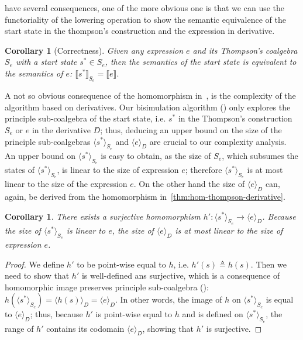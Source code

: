 \documentclass[conference]{IEEEtran}
\newtheorem{corollary}[theorem]{Corollary}
\begin{document}
 have several consequences, one of the more obvious one is that we can use the functoriality of the lowering operation to show the semantic equivalence of the start state in the thompson's construction and the expression in derivative. 

\begin{corollary}[Correctness]
    Given any expression \(e\) and its Thompson's coalgebra \(Ŝ_{e}\) with a start state \(s^* ∈ Ŝ_{e}\), then the semantics of the start state is equivalent to the semantics of \(e\): \(⟦s^*⟧_{Ŝ_{e}} = ⟦e⟧.\)
\end{corollary}

A not so obvious consequence of the homomorphism in~, is the complexity of the algorithm based on derivatives.
Our bisimulation algorithm () only explores the principle sub-coalgebra of the start state, i.e. \(s^*\) in the Thompson's construction \(Ŝ_{e}\) or \(e\) in the derivative \(D̂\); thus, deducing an upper bound on the size of the principle sub-coalgebras \(⟨s^*⟩_{Ŝ_{e}}\) and \(⟨e⟩_{D̂}\) are crucial to our complexity analysis.
An upper bound on \(⟨s^*⟩_{Ŝ_{e}}\) is easy to obtain, as the size of \(Ŝ_{e}\), which subsumes the states of \(⟨s^*⟩_{Ŝ_{e}}\), is linear to the size of expression \(e\); therefore \(⟨s^*⟩_{Ŝ_{e}}\) is at most linear to the size of the expression \(e\).
On the other hand the size of \(⟨e⟩_{D̂}\) can, again, be derived from the homomorphism in~\cref{thm:hom-thompson-derivative}.

\begin{corollary}\label{thm:suj-hom-thompson-derivative}
    There exists a surjective homomorphism \(h': ⟨s^*⟩_{Ŝ_{e}} → ⟨e⟩_{D̂}\). 
    Because the size of \(⟨s^*⟩_{Ŝ_{e}}\) is linear to \(e\), the size of \(⟨e⟩_{D̂}\) is at most linear to the size of expression \(e\).
\end{corollary}

\begin{proof}
    We define \(h'\) to be point-wise equal to \(h\), i.e. \(h'(s) ≜ h(s)\). 
    Then we need to show that \(h'\) is well-defined ans surjective, which is a consequence of homomorphic image preserves principle sub-coalgebra (): \(h(⟨s^*⟩_{Ŝ_{e}}) = ⟨h(s)⟩_{D̂} = ⟨e⟩_{D̂}.\)
    In other words, the image of \(h\) on \(⟨s^*⟩_{Ŝ_{e}}\) is equal to \(⟨e⟩_{D̂}\); thus, because \(h'\) is point-wise equal to \(h\) and is defined on \(⟨s^*⟩_{Ŝ_{e}}\), the range of \(h'\) contains its codomain \(⟨e⟩_{D̂}\), showing that \(h'\) is surjective.
\end{proof}
\end{document}
